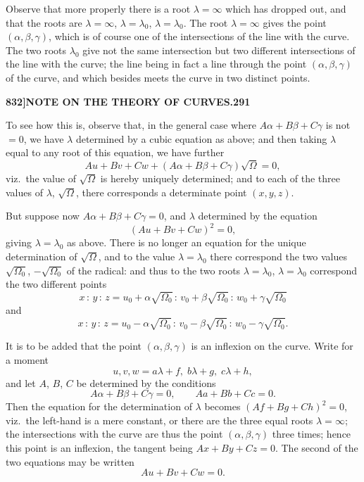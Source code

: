 \documentclass[11pt]{article}
\begin{document}
\medskip

Observe that more properly there is a root $\lambda = \infty$ which has dropped out, and that the roots are $\lambda = \infty$, $\lambda = \lambda_{0}$, $\lambda = \lambda_{0}$. The root $\lambda = \infty$ gives the point $(\alpha, \beta, \gamma)$, which is of course one of the intersections of the line with the curve. The two roots $\lambda_{0}$ give not the same intersection but two different intersections of the line with the curve; the line being in fact a line through the point $(\alpha, \beta, \gamma)$ of the curve, and which besides meets the curve in two distinct points.

\newpage

\noindent\textbf{832]}\hfill\textbf{NOTE ON THE THEORY OF CURVES.}\hfill\textbf{291}

\bigskip

\noindent To see how this is, observe that, in the general case where $A\alpha + B\beta + C\gamma$ is not $= 0$, we have $\lambda$ determined by a cubic equation as above; and then taking $\lambda$ equal to any root of this equation, we have further
\[
Au + Bv + Cw + (A\alpha + B\beta + C\gamma)\sqrt{\Omega} = 0,
\]
viz.\ the value of $\sqrt{\Omega}$ is hereby uniquely determined; and to each of the three values of $\lambda$, $\sqrt{\Omega}$, there corresponds a determinate point $(x, y, z)$.

\medskip

But suppose now $A\alpha + B\beta + C\gamma = 0$, and $\lambda$ determined by the equation
\[
(Au + Bv + Cw)^{2} = 0,
\]
giving $\lambda = \lambda_{0}$ as above. There is no longer an equation for the unique determination of $\sqrt{\Omega}$, and to the value $\lambda = \lambda_{0}$ there correspond the two values $\sqrt{\Omega_{0}}$, $-\sqrt{\Omega_{0}}$ of the radical: and thus to the two roots $\lambda = \lambda_{0}$, $\lambda = \lambda_{0}$ correspond the two different points
\[
x \,:\, y \,:\, z = u_{0} + \alpha\sqrt{\Omega_{0}} \,:\, v_{0} + \beta\sqrt{\Omega_{0}} \,:\, w_{0} + \gamma\sqrt{\Omega_{0}}
\]
and
\[
x \,:\, y \,:\, z = u_{0} - \alpha\sqrt{\Omega_{0}} \,:\, v_{0} - \beta\sqrt{\Omega_{0}} \,:\, w_{0} - \gamma\sqrt{\Omega_{0}}.
\]

\medskip

It is to be added that the point $(\alpha, \beta, \gamma)$ is an inflexion on the curve. Write for a moment
\[
u, v, w = a\lambda + f,\; b\lambda + g,\; c\lambda + h,
\]
and let $A$, $B$, $C$ be determined by the conditions
\[
A\alpha + B\beta + C\gamma = 0,\qquad Aa + Bb + Cc = 0.
\]
Then the equation for the determination of $\lambda$ becomes $(Af + Bg + Ch)^{2} = 0$, viz.\ the left-hand is a mere constant, or there are the three equal roots $\lambda = \infty$; the intersections with the curve are thus the point $(\alpha, \beta, \gamma)$ three times; hence this point is an inflexion, the tangent being $Ax + By + Cz = 0$. The second of the two equations may be written
\[
Au + Bv + Cw = 0.
\]
\end{document}
